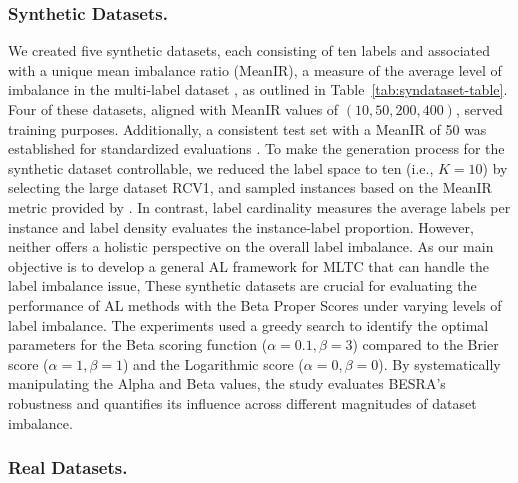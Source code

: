 \documentclass[letterpaper]{article} %
\begin{document}
\subsubsection{Synthetic Datasets.}
We created five synthetic datasets, each consisting of ten labels and associated with a unique mean imbalance ratio (MeanIR), a measure of the average level of imbalance in the multi-label dataset \cite{CHARTE20153}, as outlined in Table~\ref{tab:syndataset-table}. 
Four of these datasets, aligned with MeanIR values of $(10, 50, 200, 400)$, served training purposes. Additionally, a consistent test set with a MeanIR of 50 was established for standardized evaluations \cite{wang2023imbalanced}.
To make the generation process for the synthetic dataset controllable, 
we reduced the label space to ten (i.e., $K=10$) by selecting the large dataset RCV1, and sampled instances based on the MeanIR metric provided by \citet{CHARTE20153}.
In contrast, label cardinality measures the average labels per instance and label density evaluates the instance-label proportion. However, neither offers a holistic perspective on the overall label imbalance.
As our main objective is to develop a general AL framework for MLTC that can handle the label imbalance issue,
These synthetic datasets are crucial for evaluating the performance of AL methods with the Beta Proper Scores under varying levels of label imbalance. 
The experiments used a greedy search to identify the optimal parameters for the Beta scoring function ($\alpha = 0.1, \beta = 3$) compared to the Brier score ($\alpha = 1, \beta = 1$) and the Logarithmic score ($\alpha = 0, \beta = 0$).
By systematically manipulating the Alpha and Beta values, the study evaluates BESRA's robustness and quantifies its influence across different magnitudes of dataset imbalance.




\subsubsection{Real Datasets.}
\end{document}
